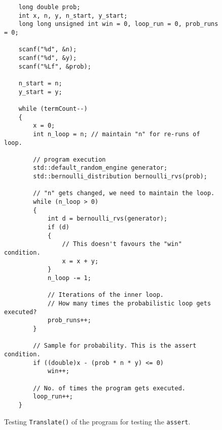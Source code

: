 \documentclass[usenames,dvipsnames,acmsmall]{acmart}
\begin{document}
	\begin{figure}
		\begin{verbatim}
	long double prob;
	int x, n, y, n_start, y_start;
	long long unsigned int win = 0, loop_run = 0, prob_runs = 0;
	
	scanf("%d", &n);
	scanf("%d", &y);
	scanf("%Lf", &prob);
	
	n_start = n;
	y_start = y;
	
	while (termCount--)
	{
		x = 0;
		int n_loop = n; // maintain "n" for re-runs of loop. 
		
		// program execution
		std::default_random_engine generator;
		std::bernoulli_distribution bernoulli_rvs(prob);
		
		// "n" gets changed, we need to maintain the loop. 
		while (n_loop > 0)
		{
			int d = bernoulli_rvs(generator);
			if (d)
			{
				// This doesn't favours the "win" condition.
				x = x + y;
			}
			n_loop -= 1;
			
			// Iterations of the inner loop.
			// How many times the probabilistic loop gets executed?
			prob_runs++;
		}
		
		// Sample for probability. This is the assert condition.
		if ((double)x - (prob * n * y) <= 0)
			win++;
		
		// No. of times the program gets executed.
		loop_run++;
	}
		\end{verbatim}
		\caption{Testing \texttt{Translate()} of the program for testing the \texttt{assert}. }
	\end{figure}
\end{document}
